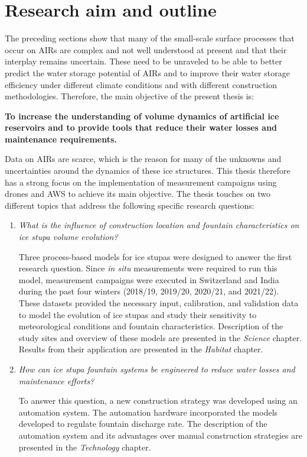 \section{Research aim and outline}

The preceding sections show that many of the small-scale surface processes that occur on \ac{AIRs} are complex
and not well understood at present and that their interplay remains uncertain. These need to be unraveled to be
able to better predict the water storage potential of \ac{AIRs} and to improve their water storage efficiency
under different climate conditions and with different construction methodologies. Therefore, the main objective
of the present thesis is:

\begin{thesis_quotation}

  \textbf{To increase the understanding of volume dynamics of artificial ice reservoirs and to
  provide tools that reduce their water losses and maintenance requirements.}

\end{thesis_quotation}

Data on \ac{AIRs} are scarce, which is the reason for many of the unknowns and uncertainties around the dynamics
of these ice structures. This thesis therefore has a strong focus on the implementation of measurement campaigns
using drones and \ac{AWS} to achieve its main objective. The thesis touches on two different topics that address
the following specific research questions:

\begin{enumerate}

  \item \textit{What is the influence of construction location and fountain characteristics on ice stupa volume
    evolution?}

Three process-based models for ice stupas were designed to answer the first research question. Since \textit{in
situ} measurements were required to run this model, measurement campaigns were executed in Switzerland and India
during the past four winters (2018/19, 2019/20, 2020/21, and 2021/22). These datasets provided the necessary
input, calibration, and validation data to model the evolution of ice stupas and study their sensitivity to
meteorological conditions and fountain characteristics. Description of the study sites and overview of these
models are presented in the \textit{Science} chapter. Results from their application are presented in the
\textit{Habitat} chapter.

  \item \textit{How can ice stupa fountain systems be engineered to reduce water losses and maintenance
    efforts?}

To answer this question, a new construction strategy was developed using an automation system. The automation
hardware incorporated the models developed to regulate fountain discharge rate. The description of the
automation system and its advantages over manual construction strategies are presented in the
\textit{Technology} chapter.

\end{enumerate}

